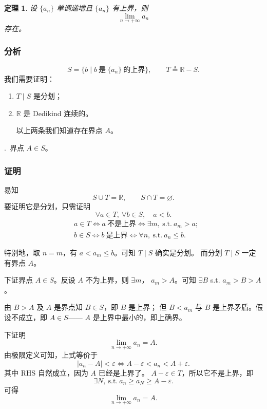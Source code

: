 \documentclass[UTF8,11pt]{ctexart}
\theoremstyle{cnthm}
\newtheorem{thm}{定理}[section]
\begin{document}
\begin{thm}
设 $\{a_n\}$ 单调递增且 $\{a_n\}$ 有上界，则
\[
\lim_{n\to+\infty}a_n
\]
存在。
\end{thm}

\subsubsection*{分析}

\[
S=\{b\mid b\ \text{是}\ \{a_n\}\ \text{的上界}\},\qquad
T\triangleq\mathbb R-S .
\]
我们需要证明：

\begin{enumerate}
\item $T\mid S$ 是分划；
\item $\mathbb R$ 是 Dedikind 连续的。

以上两条我们知道存在界点 $A$。
\end{enumerate}

.\ 界点 $A\in S$。

\subsubsection*{证明}

易知
\[
S\cup T=\mathbb R,\qquad S\cap T=\varnothing .
\]
要证明它是分划，只需证明
\[
\forall a\in T,\ \forall b\in S,\quad a<b .
\]
\[
\begin{aligned}
&a\in T\iff a\ \text{不是上界}\iff\exists m,\ \text{s.t.}\ a_m>a;\\
&b\in S\iff b\ \text{是上界}\iff\forall n,\ \text{s.t.}\ a_n\leq b .
\end{aligned}
\]

特别地，取 $n=m$，有 $a<a_m\leq b$。可知 $T\mid S$ 确实是分划。
而分划 $T\mid S$ 一定有界点 $A$。

下证界点 $A\in S$。反设 $A$ 不为上界，则 $\exists m$，
$a_m>A$。可知 $\exists B$ s.t. $a_m>B>A$。

由 $B>A$ 及 $A$ 是界点知 $B\in S$，即 $B$ 是上界；
但 $B<a_m$ 与 $B$ 是上界矛盾。假设不成立，即 $A\in S$——
$A$ 是上界中最小的，即上确界。

下证明
\[
\lim_{n\to+\infty}a_n=A .
\]
由极限定义可知，上式等价于
\[
|a_n-A|<\varepsilon
\iff A-\varepsilon<a_n<A+\varepsilon .
\]
其中 RHS 自然成立，因为 $A$ 已经是上界了。
$A-\varepsilon\in T$，所以它不是上界，即
\[
\exists N,\ \text{s.t.}\ a_n\geq a_N\geq A-\varepsilon .
\]
可得
\[
\lim_{n\to+\infty}a_n=A .
\]
\end{document}

